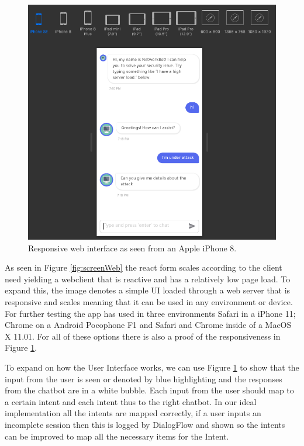 \begin{figure}[!h]
    \centering
    \includegraphics[scale=0.65]{MA-BA-Thesis/iphoneScreenUI.png}
    \caption{Responsive web interface as seen from an Apple iPhone 8.}
    \label{fig:screenIphone}
\end{figure}
 As seen in Figure \ref{fig:screenWeb} the react form scales according to the client need yielding a webclient that is reactive and has a relatively low page load. To expand this, the image denotes a simple UI loaded through a web server that is responsive and scales meaning that it can be used in any environment or device. For further testing the app has used in three environments Safari in a iPhone 11; Chrome on a Android Pocophone F1 and Safari and Chrome inside of a MacOS X 11.01. For all of these options there is also a proof of the responsiveness in Figure \ref{fig:screenIphone}.
 
 To expand on how the User Interface works, we can use Figure \ref{fig:screenIphone} to show that the input from the user is seen or denoted by blue highlighting and the responses from the chatbot are in a white bubble. Each input from the user should map to a certain intent and each intent thus to the right chatbot. In our ideal implementation all the intents are mapped correctly, if a user inputs an incomplete session then this is logged by DialogFlow and shown so the intents can be improved to map all the necessary items for the Intent.
 
